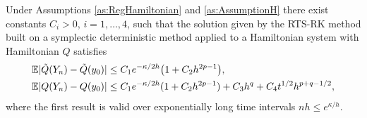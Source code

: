 \documentclass{siamart1116}
\numberwithin{theorem}{section}
\DeclarePairedDelimiter{\abs}{\lvert}{\rvert}
\newcommand{\E}{\operatorname{\mathbb{E}}}
\begin{document}
\begin{theorem}\label{thm:RTSHamiltonian} Under Assumptions \ref{as:RegHamiltonian} and \ref{as:AssumptionH} there exist constants $C_i > 0$, $i = 1, \ldots, 4$, such that the solution given by the RTS-RK method built on a symplectic deterministic method applied to a Hamiltonian system with Hamiltonian $Q$ satisfies
	\begin{align}
		\E \abs{\tilde Q(Y_n) - \tilde Q(y_0)} &\leq C_1 e^{-\kappa/2h}\big(1 + C_2 h^{2p-1}\big), \\
		\E \abs{Q(Y_n) - Q(y_0)} &\leq C_1 e^{-\kappa/2h}(1 + C_2 h^{2p-1}) + C_3 h^q + C_4 t^{1/2} h^{p+q-1/2}, \label{eq:ErrorHamiltonian}
	\end{align}
	where the first result is valid over exponentially long time intervals $nh \leq e^{\kappa / h}$.
\end{theorem}
\end{document}
